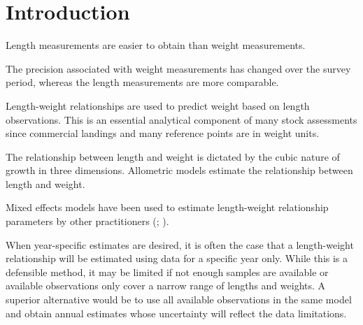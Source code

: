 \documentclass[12pt]{article}\usepackage[]{graphicx}\usepackage[]{color}
\begin{document}

\frontmatter


\renewcommand{\headrulewidth}{0.5pt}  %
\renewcommand{\footrulewidth}{0.5pt}  %

\newcommand{\lt}{\ensuremath <}
\newcommand{\gt}{\ensuremath >}

% 
\section{Introduction}\label{sec:introduction}

Length measurements are easier to obtain than weight measurements.

The precision associated with weight measurements has changed over the survey period, whereas the length measurements are more comparable.

Length-weight relationships are used to predict weight based on length observations. This is an essential analytical component of many stock assessments since commercial landings and many reference points are in weight units.

The relationship between length and weight is dictated by the cubic nature of growth in three dimensions. Allometric models estimate the relationship between length and weight.

Mixed effects models have been used to estimate length-weight relationship parameters by other practitioners (; ).

When year-specific estimates are desired, it is often the case that a length-weight relationship will be estimated using data for a specific year only. While this is a defensible method, it may be limited if not enough samples are available or available observations only cover a narrow range of lengths and weights. A superior alternative would be to use all available observations in the same model and obtain annual estimates whose uncertainty will reflect the data limitations.
\end{document}

